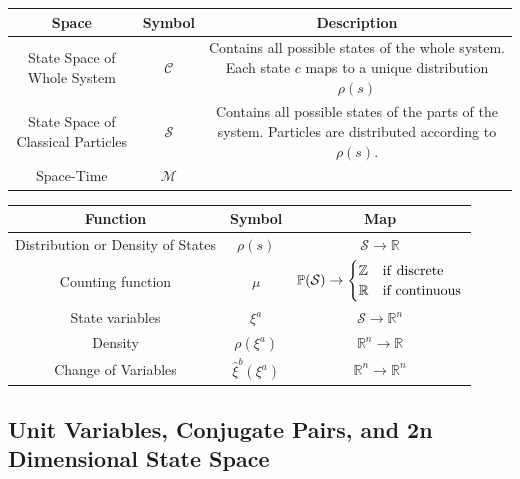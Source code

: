 \documentclass{article}
\begin{document}
\begin{center}
\renewcommand{\arraystretch}{1.5}
 \begin{tabular}{| c | c | c |}
 \hline
 Space & Symbol & Description \\ [0.5ex] 
 \hline\hline
 State Space of Whole System & $\mathcal{C}$ & Contains all possible states of the whole system. Each state $c$ maps to a unique distribution $\rho(s)$\\ [2ex]
 \hline
 State Space of Classical Particles & $\mathcal{S}$ & Contains all possible states of the parts of the system. Particles are distributed according to $\rho(s)$. \\ [2ex]
 \hline
 Space-Time & $\mathcal{M}$ &  \\ [1ex] 
 \hline
\end{tabular}
\end{center}

\begin{center}
\renewcommand{\arraystretch}{2.5}
 \begin{tabular}{| c | c | c |}
 \hline
 Function & Symbol & Map \\ [0.5ex] 
 \hline\hline
 Distribution or Density of States & $\rho(s)$ & $\mathcal{S} \to \mathbb{R}$ \\
 \hline
 Counting function & $\mu$ & $\mathbb{P}(\mathcal{S}) \to \begin{cases}
 \mathbb{Z} & \text{if \textrm{discrete}}\\
 \mathbb{R} & \textrm{if continuous} \end{cases}$ \\ [2ex]
 \hline
 State variables & $\xi^a$ & $\mathcal{S} \to \mathbb{R}^n$ \\
 \hline
 Density & $\rho(\xi^a)$ & $\mathbb{R}^n \to \mathbb{R}$ \\
 \hline
 Change of Variables & $\hat{\xi}^b(\xi^a)$ & $\mathbb{R}^n \to \mathbb{R}^n$ \\ [1ex] 
 \hline
\end{tabular}
\end{center}

\subsection{Unit Variables, Conjugate Pairs, and 2n Dimensional State Space}
\end{document}
